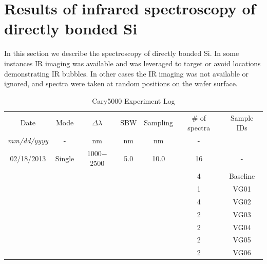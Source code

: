 \documentclass[osajnl,preprint,showpacs,superscriptaddress,12pt]{revtex4-1} %
\begin{document}
\section{Results of infrared spectroscopy of directly bonded Si}
\label{secResults}
In this section we describe the spectroscopy of directly bonded Si.  In some instances IR imaging was available and was leveraged to target or avoid locations demonstrating IR bubbles.  In other cases the IR imaging was not available or ignored, and spectra were taken at random positions on the wafer surface.  

\begin{table}[h!]
\caption{Cary5000 Experiment Log \label{tabExperiments}}
\begin{center}
    \begin{tabular}{c c c c c c c}
    \hline
	Date &  Mode  & $\Delta \lambda$ & SBW & Sampling & \# of spectra & Sample IDs \\
	\emph{mm/dd/yyyy} &  -  & nm & nm & nm & - \\
     \hline		
     	02/18/2013 & Single & 1000$-$2500 & 5.0 & 10.0 &  16 &   -  \\
     	                   &            &                       &       &         &    4 &  Baseline\\	
     	                   &            &                       &       &         &    1 &  VG01\\
	                   &            &                       &       &         &    4 &  VG02\\	                   
	                   &            &                       &       &         &    2 &  VG03\\	                   
	                   &            &                       &       &         &    2 &  VG04\\
	                   &            &                       &       &         &    2 &  VG05\\	                   
	                   &            &                       &       &         &    2 &  VG06\\
    \hline

\end{tabular}
\end{center}
\end{table}
\end{document}
